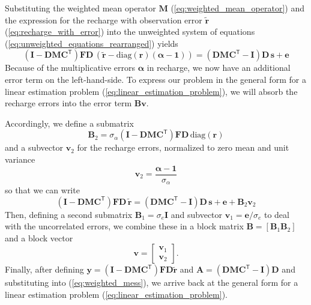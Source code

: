 \documentclass[11pt,a4paper]{article}
\renewcommand{\vec}[1]{\mathbf{#1}}
\begin{document}
Substituting the weighted mean operator $\vec{M}$
(\ref{eq:weighted_mean_operator}) and the expression for the recharge
with observation error $\tilde{\vec{r}}$
(\ref{eq:recharge_with_error}) into the unweighted system of equations
(\ref{eq:unweighted_equations_rearranged}) yields
\begin{equation}
  \left(\vec{I} - \vec{D}\vec{M}\vec{C}^\mathsf{T}\right)\vec{FD}\,\left(\tilde{\vec{r}} - \text{diag}(\vec{r})\left(\bm\alpha - \vec{1}\right)\right) = \left(\vec{D}\vec{M}\vec{C}^\mathsf{T} - \vec{I}\right)\vec{D}\,\vec{s} + \vec{e}
\end{equation}
Because of the multiplicative errors $\bm\alpha$ in recharge, we now
have an additional error term on the left-hand-side.  To express our
problem in the general form for a linear estimation problem
(\ref{eq:linear_estimation_problem}), we will absorb the recharge
errors into the error term $\vec{B}\vec{v}$.

Accordingly, we define a submatrix
\begin{equation}
  \label{eq:B_2}
  \vec{B}_2 = \sigma_\alpha\left(\vec{I} - \vec{DMC}^\mathsf{T}\right)\vec{FD}\,\text{diag}(\vec{r})
\end{equation}
and a subvector $\vec{v}_2$ for the recharge errors, normalized to
zero mean and unit variance
\begin{equation}
  \label{eq:v_2}
  \vec{v}_2 = \frac{\bm\alpha - \vec{1}}{\sigma_\alpha}
\end{equation}
so that we can write
\begin{equation}
  \label{eq:weighted_mess}
  \left(\vec{I} - \vec{D}\vec{M}\vec{C}^\mathsf{T}\right)\vec{FD}\,\tilde{\vec{r}} = \left(\vec{D}\vec{M}\vec{C}^\mathsf{T} - \vec{I}\right)\vec{D}\,\vec{s} + \vec{e} + \vec{B}_2\vec{v}_2
\end{equation}
Then, defining a second submatrix $\vec{B}_1 = \sigma_e\vec{I}$ and
subvector $\vec{v}_1 = \vec{e} / \sigma_e$ to deal with the
uncorrelated errors, we combine these in a block matrix
$\vec{B} = \left[ \vec{B}_1 \vec{B}_2\right]$ and a block vector
\begin{equation}
  \label{eq:v_block}
  \vec{v} = \left[
    \begin{array}{c}
      \vec{v}_1\\
      \vec{v}_2
    \end{array}
  \right].
\end{equation}
Finally, after defining
$\vec{y} = \left(\vec{I} -
  \vec{DMC}^\mathsf{T}\right)\vec{FD}\tilde{\vec{r}}$ and
$\vec{A} = (\vec{DMC}^\mathsf{T} - \vec{I})\vec{D}$ and substituting
into (\ref{eq:weighted_mess}), we arrive back at the general form for
a linear estimation problem (\ref{eq:linear_estimation_problem}).
\end{document}
